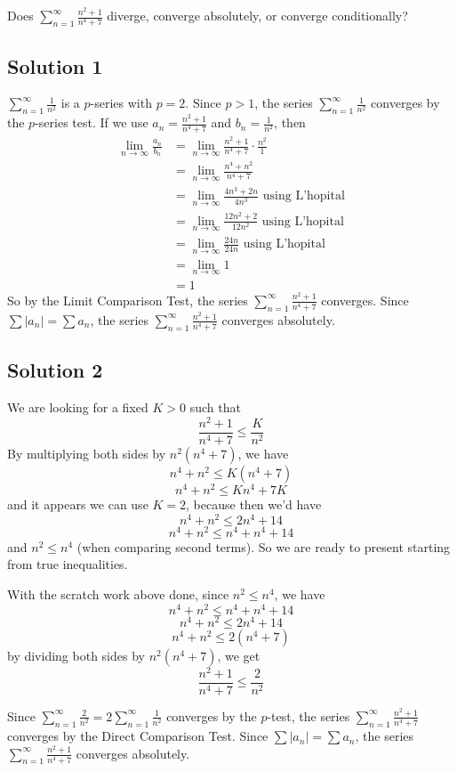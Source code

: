 \documentclass{article}
\begin{document}
\noindent
Does $\displaystyle \sum_{n=1}^\infty \frac{n^2+1}{n^4+7}$
diverge, converge absolutely, or converge conditionally?

\subsection*{Solution 1}

$\displaystyle \sum_{n=1}^\infty \frac1{n^2}$ is a $p$-series with $p=2$. Since $p > 1$, the series $\displaystyle \sum_{n=1}^\infty \frac1{n^2}$ converges by the $p$-series test. If we use $a_n = \frac{n^2+1}{n^4+7}$ and $b_n = \frac1{n^2}$, then
\begin{align*}
\lim_{n \to \infty} \frac{a_n}{b_n}
&= \lim_{n \to \infty} \frac{n^2+1}{n^4+7} \cdot \frac{n^2}{1}\\
&= \lim_{n \to \infty} \frac{n^4+n^2}{n^4+7} \\
&= \lim_{n \to \infty} \frac{4n^3+2n}{4n^3} \text{ using L'hopital}\\
&= \lim_{n \to \infty} \frac{12n^2+2}{12n^2} \text{ using L'hopital}\\
&= \lim_{n \to \infty} \frac{24n}{24n} \text{ using L'hopital}\\
&= \lim_{n \to \infty} 1\\
&= 1
\end{align*}
So by the Limit Comparison Test, the series $\displaystyle \sum_{n=1}^\infty \frac{n^2+1}{n^4+7}$ converges.
Since $\sum |a_n| = \sum a_n$, the series $\displaystyle \sum_{n=1}^\infty \frac{n^2+1}{n^4+7}$ converges absolutely.

\subsection*{Solution 2}

We are looking for a fixed $K > 0$ such that 
\[ \frac{n^2+1}{n^4+7} \leq \frac{K}{n^2}\]
By multiplying both sides by $n^2(n^4+7)$, we have
\[ n^4+n^2 \leq K(n^4+7)\]
\[ n^4+n^2 \leq Kn^4+7K\]
and it appears we can use $K=2$, because then we'd have
\[ n^4+n^2 \leq 2n^4+14\]
\[ n^4+n^2 \leq n^4+n^4+14\]
and $n^2 \leq n^4$ (when comparing second terms).
So we are ready to present starting from true inequalities.

With the scratch work above done, since $n^2 \leq n^4$, we have
\[ n^4+n^2 \leq n^4+n^4+14\]
\[ n^4+n^2 \leq 2n^4+14\]
\[ n^4+n^2 \leq 2(n^4+7)\]
by dividing both sides by $n^2(n^4+7)$, we get
\[ \frac{n^2+1}{n^4+7} \leq \frac{2}{n^2}\]

Since $\displaystyle \sum_{n=1}^\infty \frac2{n^2} = 2\sum_{n=1}^\infty \frac1{n^2}$ converges by the $p$-test, the series 
$\displaystyle \sum_{n=1}^\infty \frac{n^2+1}{n^4+7}$ converges by the Direct Comparison Test.
Since $\sum |a_n| = \sum a_n$, the series $\displaystyle \sum_{n=1}^\infty \frac{n^2+1}{n^4+7}$ converges absolutely.
\end{document}
